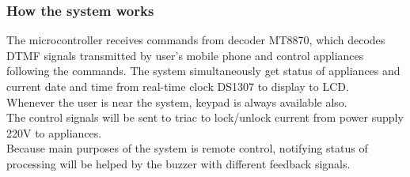 \documentclass[a4paper]{article}
\begin{document}
\subsubsection{How the system works}
The microcontroller receives commands from decoder MT8870, which decodes DTMF signals transmitted by user's mobile phone and control appliances following the commands. The system simultaneously get status of appliances and current date and time from real-time clock DS1307 to display to LCD.\\
Whenever the user is near the system, keypad is always available also.\\
The control signals will be sent to triac to lock/unlock current from power supply 220V to appliances.\\
Because main purposes of the system is remote control, notifying status of processing will be helped by the buzzer with different feedback signals.
\end{document}
